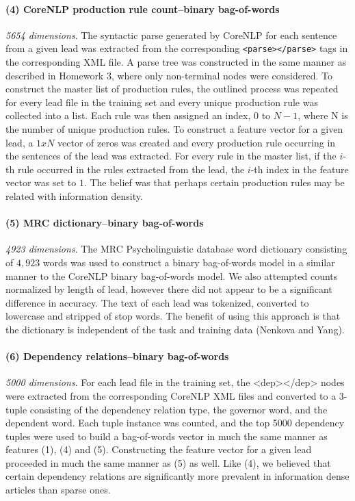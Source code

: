 \documentclass[
10pt, %
a4paper, %
oneside, %
headinclude,footinclude, %
BCOR5mm, %
]{scrartcl}
\begin{document}
\paragraph{\textbf{(4) CoreNLP production rule count--binary bag-of-words}}
\hfill \newline \noindent \textit{5654 dimensions}. The syntactic parse
generated by CoreNLP for each sentence from a given lead was extracted from the
corresponding \texttt{<parse></parse>} tags in the corresponding XML file. A
parse tree was constructed in the same manner as described in Homework 3, where
only non-terminal nodes were considered. To construct the master list of
production rules, the outlined process was repeated for every lead file in the
training set and every unique production rule was collected into a list. Each
rule was then assigned an index, $0$ to $N-1$, where N is the number of unique
production rules. To construct a feature vector for a given lead, a $1 x N$
vector of zeros was created and every production rule occurring in the sentences
of the lead was extracted. For every rule in the master list, if the $i$-th rule
occurred in the rules extracted from the lead, the $i$-th index in the feature
vector was set to $1$. The belief was that perhaps certain production rules may
be related with information density.

\paragraph{\textbf{(5) MRC dictionary--binary bag-of-words}}
\hfill \newline \noindent \textit{4923 dimensions}. 
The MRC Psycholinguistic database word dictionary consisting of $4,923$ words
was used to construct a binary bag-of-words model in a similar manner to the
CoreNLP binary bag-of-words model. We also attempted counts normalized by length
of lead, however there did not appear to be a significant difference in
accuracy. The text of each lead was tokenized, converted to lowercase and
stripped of stop words. The benefit of using this approach is that the
dictionary is independent of the task and training data (Nenkova and Yang).

\paragraph{\textbf{(6) Dependency relations--binary bag-of-words}}
\hfill \newline \noindent \textit{5000 dimensions}. 
For each lead file in the training set, the <dep></dep> nodes were extracted 
from the corresponding CoreNLP XML files and converted to a 3-tuple consisting 
of the dependency relation type, the governor word, and the dependent word. 
Each tuple instance was counted, and the top 5000 dependency tuples were used 
to build a bag-of-words vector in much the same manner as features (1), (4)
and (5). Constructing the feature vector for a given lead proceeded in much the
same manner as (5) as well. Like (4), we believed that certain dependency
relations are significantly more prevalent in information dense articles than
sparse ones.
\end{document}
